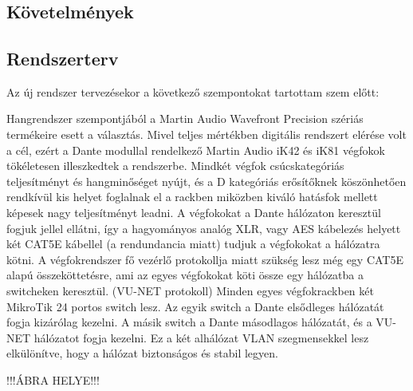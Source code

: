 \chapter{\SystemDesign}
\section{Követelmények}

 

\section{Rendszerterv}


Az új rendszer tervezésekor a következő szempontokat tartottam szem előtt:








Hangrendszer szempontjából a Martin Audio Wavefront Precision szériás termékeire esett a választás.
Mivel teljes mértékben digitális rendszert elérése volt a cél, ezért a Dante modullal
rendelkező Martin Audio iK42 és iK81 végfokok tökéletesen illeszkedtek a rendszerbe.
Mindkét végfok csúcskategóriás teljesítményt és hangminőséget nyújt, és a D kategóriás
erősítőknek köszönhetően rendkívül kis helyet foglalnak el a rackben miközben kiváló hatásfok
mellett képesek nagy teljesítményt leadni. A végfokokat a Dante hálózaton keresztül
fogjuk jellel ellátni, így a hagyományos analóg XLR, vagy AES kábelezés helyett két CAT5E kábellel (a rendundancia miatt)
tudjuk a végfokokat a hálózatra kötni. A végfokrendszer fő vezérlő protokollja miatt szükség lesz még egy CAT5E alapú
összeköttetésre, ami az egyes végfokokat köti össze egy hálózatba a switcheken keresztül. (VU-NET protokoll)
Minden egyes végfokrackben két MikroTik 24 portos switch lesz. Az egyik switch a Dante elsődleges hálózatát fogja kizárólag kezelni. 
A másik switch a Dante másodlagos hálózatát, és a VU-NET hálózatot fogja kezelni. 
Ez a két alhálózat VLAN szegmensekkel lesz elkülönítve, hogy a hálózat biztonságos és stabil legyen.



!!!ÁBRA HELYE!!!

